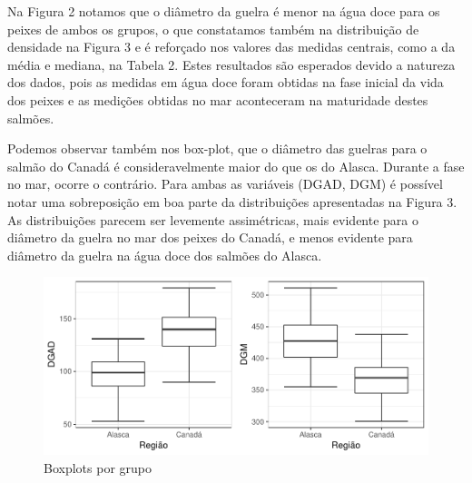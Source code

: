 \documentclass[10pt,portuguese,]{article}
\begin{document}
\vspace{0.5cm}

Na Figura 2 notamos que o diâmetro da guelra é menor na água doce para
os peixes de ambos os grupos, o que constatamos também na distribuição
de densidade na Figura 3 e é reforçado nos valores das medidas centrais,
como a da média e mediana, na Tabela 2. Estes resultados são esperados
devido a natureza dos dados, pois as medidas em água doce foram obtidas
na fase inicial da vida dos peixes e as medições obtidas no mar
aconteceram na maturidade destes salmões.

Podemos observar também nos box-plot, que o diâmetro das guelras para o
salmão do Canadá é consideravelmente maior do que os do Alasca. Durante
a fase no mar, ocorre o contrário. Para ambas as variáveis (DGAD, DGM) é
possível notar uma sobreposição em boa parte da distribuições
apresentadas na Figura 3. As distribuições parecem ser levemente
assimétricas, mais evidente para o diâmetro da guelra no mar dos peixes
do Canadá, e menos evidente para diâmetro da guelra na água doce dos
salmões do Alasca.

\vspace{0.5cm}

\begin{figure}[!h]

{\centering \includegraphics{RELATORIO_FINAL_FORMATADO_files/figure-latex/unnamed-chunk-11-1} 

}

\caption{Boxplots por grupo}\label{fig:unnamed-chunk-11}
\end{figure}

\vspace{0.5cm}
\end{document}
